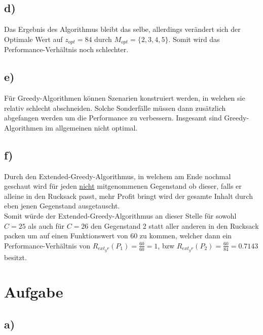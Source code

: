 \documentclass[12pt]{article}
\begin{document}
	\subsection{d)}
	Das Ergebnis des Algorithmus bleibt das selbe, allerdings verändert sich der Optimale Wert auf $z_{opt}=84$ durch $M_{opt}=\{2,3,4,5\}$. Somit wird das Performance-Verhältnis noch schlechter.
	
	\subsection{e)}
	Für Greedy-Algorithmen können Szenarien konstruiert werden, in welchen sie relativ schlecht abschneiden. Solche Sonderfälle müssen dann zusätzlich abgefangen werden um die Performance zu verbessern. Insgesamt sind Greedy-Algorithmen im allgemeinen nicht optimal.
	
	\subsection{f)}
	Durch den Extended-Greedy-Algorithmus, in welchem am Ende nochmal geschaut wird für jeden \underline{nicht} mitgenommenen Gegenstand ob dieser, falls er alleine in den Rucksack passt, mehr Profit bringt wird der gesamte Inhalt durch eben jenen Gegenstand ausgetauscht.\\
	Somit würde der Extended-Greedy-Algorithmus an dieser Stelle für sowohl $C=25$ als auch für $C=26$ den Gegenstand 2 statt aller anderen in den Rucksack packen um auf einen Funktionswert von 60 zu kommen, welcher dann ein Performance-Verhältnis von $R_{ext_gr}(P_1)=\frac{60}{60}=1$, bzw $R_{ext_gr}(P_2)=\frac{60}{84}=0.7143$ besitzt.
	
	\section{Aufgabe}
	\subsection{a)}
	
\end{document}
